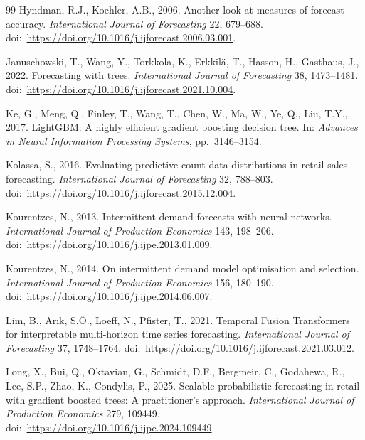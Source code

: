 \documentclass[review,authoryear]{elsarticle}
\begin{document}
\begin{thebibliography}{99}
Hyndman, R.J., Koehler, A.B., 2006.
Another look at measures of forecast accuracy.
\textit{International Journal of Forecasting} 22, 679--688.
doi:\ \url{https://doi.org/10.1016/j.ijforecast.2006.03.001}.

Januschowski, T., Wang, Y., Torkkola, K., Erkkil{\"a}, T., Hasson, H., Gasthaus, J., 2022.
Forecasting with trees.
\textit{International Journal of Forecasting} 38, 1473--1481.
doi:\ \url{https://doi.org/10.1016/j.ijforecast.2021.10.004}.

Ke, G., Meng, Q., Finley, T., Wang, T., Chen, W., Ma, W., Ye, Q., Liu, T.Y., 2017.
LightGBM: A highly efficient gradient boosting decision tree.
In: \textit{Advances in Neural Information Processing Systems}, pp.\ 3146--3154.

Kolassa, S., 2016.
Evaluating predictive count data distributions in retail sales forecasting.
\textit{International Journal of Forecasting} 32, 788--803.
doi:\ \url{https://doi.org/10.1016/j.ijforecast.2015.12.004}.

Kourentzes, N., 2013.
Intermittent demand forecasts with neural networks.
\textit{International Journal of Production Economics} 143, 198--206.
doi:\ \url{https://doi.org/10.1016/j.ijpe.2013.01.009}.

Kourentzes, N., 2014.
On intermittent demand model optimisation and selection.
\textit{International Journal of Production Economics} 156, 180--190.
doi:\ \url{https://doi.org/10.1016/j.ijpe.2014.06.007}.

Lim, B., Ar\i{k}, S.\"O., Loeff, N., Pfister, T., 2021.
Temporal Fusion Transformers for interpretable multi-horizon time series forecasting.
\textit{International Journal of Forecasting} 37, 1748--1764.
doi:\ \url{https://doi.org/10.1016/j.ijforecast.2021.03.012}.

Long, X., Bui, Q., Oktavian, G., Schmidt, D.F., Bergmeir, C., Godahewa, R., Lee, S.P., Zhao, K., Condylis, P., 2025.
Scalable probabilistic forecasting in retail with gradient boosted trees: A practitioner's approach.
\textit{International Journal of Production Economics} 279, 109449.
doi:\ \url{https://doi.org/10.1016/j.ijpe.2024.109449}.


\end{thebibliography}
\end{document}
